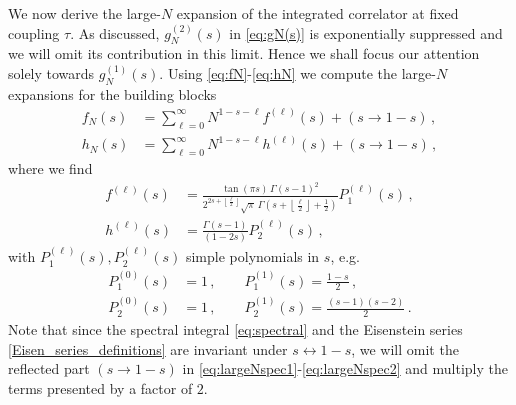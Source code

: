 \documentclass[aps,prl,twocolumn, longbibliography,footinbib,superscriptaddress, preprintnumbers]{revtex4-1}
\newcommand{\<}{\langle}
\renewcommand{\>}{\rangle}
\begin{document}
We now derive the large-$N$ expansion of the integrated correlator at fixed coupling $\tau$. As discussed, $g^{(2)}_N(s)$ in \eqref{eq:gN(s)} is exponentially suppressed and we will omit its contribution in this limit.
Hence we shall focus our attention solely towards $g^{(1)}_N(s)$. Using \eqref{eq:fN}-\eqref{eq:hN} we compute the large-$N$ expansions for the building blocks
\begin{align}
f_N(s) &\label{eq:largeNspec1}= \sum^{\infty}_{\ell=0} N^{1-s-\ell} f^{(\ell)}(s) +(s\to1-s)\,,\\
h_N(s) &\label{eq:largeNspec2}= \sum^{\infty}_{\ell=0} N^{1-s-\ell} h^{(\ell)}(s) +(s\to1-s)\, ,
\end{align}
where we find
\begin{align}
   f^{(\ell)}(s) &\label{eq:fell}=
  \frac{ \tan (\pi  s) \, \Gamma (s-1)^2 }{2^{2s+\left\lfloor \frac{\ell}{2}\right\rfloor }\sqrt{\pi }\, \Gamma \left(s {+} \left\lfloor \frac{\ell}{2}\right\rfloor {+} \frac{1}{2}\right)} P^{(\ell)}_1(s)\,,\\
    h^{(\ell)}(s)
    &\label{eq:hell} =
   \frac{ \Gamma(s-1)}{(1-2s)} P^{(\ell)}_2(s) \, ,
\end{align}
with $P_1^{(\ell)}(s),P_2^{(\ell)}(s)$ simple polynomials in $s$, e.g.
\begin{align}
P_1^{(0)}(s) &\label{eq:P1}= 1\,,\qquad P_1^{(1)}(s) = \frac{1-s}{2}\,,\\
P_2^{(0)}(s) &\label{eq:P2}=1\,,\qquad P_2^{(1)}(s) = \frac{ (s-1) (s-2)}{2}\,.
\end{align}
Note that since the spectral integral \eqref{eq:spectral} and the Eisenstein series \eqref{Eisen_series_definitions} are invariant under $s\leftrightarrow 1-s$, we will omit the reflected part $(s\to 1-s)$ in \eqref{eq:largeNspec1}-\eqref{eq:largeNspec2} and multiply the terms presented by a factor of $2$.
\end{document}
